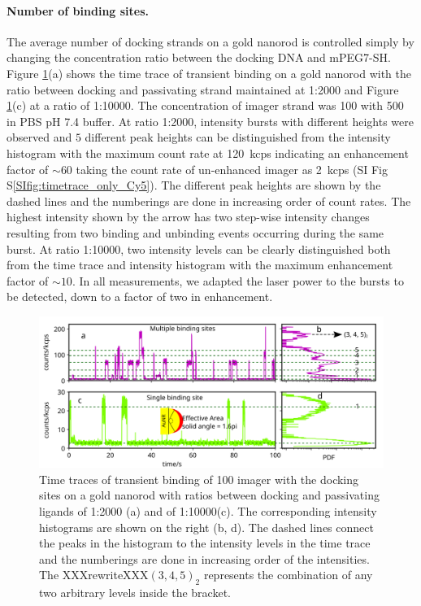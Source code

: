 \paragraph*{Number of binding sites.} The average number of docking strands on a gold nanorod is controlled simply by changing the concentration ratio between the docking DNA and mPEG7-SH.
Figure \ref{fig:timetrace1vsmany}(a) shows the time trace of transient binding on a gold nanorod with the ratio between docking and passivating strand maintained at 1:2000 and Figure \ref{fig:timetrace1vsmany}(c) at a ratio of 1:10000.
The concentration of imager strand was \SI{100}{\nM} with \SI{500}{\mM}  in PBS pH 7.4 buffer.
At ratio 1:2000, intensity bursts with different heights were observed and $5$ different peak heights can be distinguished from the intensity histogram with the maximum count rate at \SI{120}{ kcps} indicating an enhancement factor of $\sim60$ taking the count rate of un-enhanced imager as \SI{2} { kcps} (SI Fig S\ref{SIfig:timetrace_only_Cy5}).
The different peak heights are shown by the dashed lines and the numberings are done in increasing order of count rates.
The highest intensity shown by the arrow has two step-wise intensity changes resulting from two binding and unbinding events occurring during the same burst.
At ratio 1:10000, two intensity levels can be clearly distinguished both from the time trace and intensity histogram with the maximum enhancement factor of $\sim10$.
In all measurements, we adapted the laser power to the bursts to be detected, down to a factor of two in enhancement.
\begin{figure}[ht]
	\centering
	\includegraphics[width=\textwidth]{timetrace1vsmany}%
	\caption{Time traces of transient binding of \SI{100}{\nM} imager with the docking sites on a gold nanorod with ratios between docking and passivating ligands of 1:2000 (a) and of 1:10000(c).
	The corresponding intensity histograms are shown on the right (b, d).
	The dashed lines connect the peaks in the histogram to the intensity levels in the time trace and the numberings are done in increasing order of the intensities.
	The XXXrewriteXXX$(3, 4, 5)_2$ represents the combination of any two arbitrary levels inside the bracket. 
	}
  	\label{fig:timetrace1vsmany}
\end{figure}

